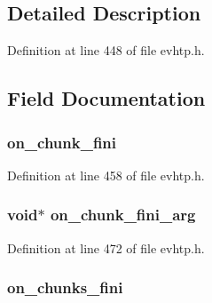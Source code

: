 \subsection{\-Detailed \-Description}


\-Definition at line 448 of file evhtp.\-h.



\subsection{\-Field \-Documentation}
\hypertarget{structevhtp__hooks__s_a7905e89a5d4086104635ddc867e02fe1}{
\subsubsection[{on\-\_\-chunk\-\_\-fini}]{ {\bf on\-\_\-chunk\-\_\-fini}}}\label{structevhtp__hooks__s_a7905e89a5d4086104635ddc867e02fe1}


\-Definition at line 458 of file evhtp.\-h.

\hypertarget{structevhtp__hooks__s_a1f6538f0edf009f607c913eaf0400a1a}{
\subsubsection[{on\-\_\-chunk\-\_\-fini\-\_\-arg}]{\setlength{\rightskip}{0pt plus 5cm}void$\ast$ {\bf on\-\_\-chunk\-\_\-fini\-\_\-arg}}}\label{structevhtp__hooks__s_a1f6538f0edf009f607c913eaf0400a1a}


\-Definition at line 472 of file evhtp.\-h.

\hypertarget{structevhtp__hooks__s_a0801884b636d618c7fa881668996ce4a}{
\subsubsection[{on\-\_\-chunks\-\_\-fini}]{ {\bf on\-\_\-chunks\-\_\-fini}}}\label{structevhtp__hooks__s_a0801884b636d618c7fa881668996ce4a}


